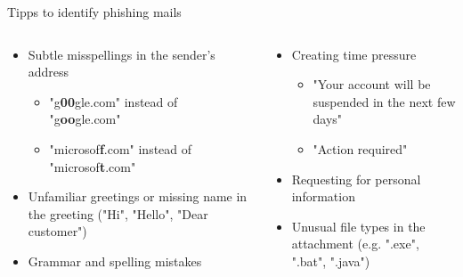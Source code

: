 \documentclass[compress,dvipsnames]{beamer}
\newcommand{\blockTitleSize}{\huge}
\newcommand{\phms}{phishing mails}
\begin{document}
\begin{block}{\centering \blockTitleSize Tipps to identify \phms}
    \begin{columns}[T]
        \begin{column}{0.485\textwidth}
            \begin{minipage}[t][0.1\textheight][t]{\textwidth}
                \large
                \begin{itemize}
                    \item Subtle misspellings in the sender's address
                    \begin{itemize}
                        \large
                        \item "g\textbf{00}gle.com" instead of "g\textbf{oo}gle.com"
                        \item "microsof\textbf{f}.com" instead of "microsof\textbf{t}.com"
                    \end{itemize}
                    \item Unfamiliar greetings or missing name in the greeting ("Hi", "Hello", "Dear customer")
                    \item Grammar and spelling mistakes
                \end{itemize}
            \end{minipage}
        \end{column}

        \begin{column}{0.485\textwidth}
            \begin{minipage}[t][0.075\textheight][t]{\textwidth}
                \large
                \begin{itemize}
                \item Creating time pressure
                    \begin{itemize}
                        \large
                        \item "Your account will be suspended in the next few days"
                        \item "Action required"
                    \end{itemize}
                    \item Requesting for personal information
                    \beg
                    \item Unusual file types in the attachment (e.g. ".exe", ".bat", ".java")
                \end{itemize}
            \end{minipage}
        \end{column}
    \end{columns}
\end{block}
\end{document}
